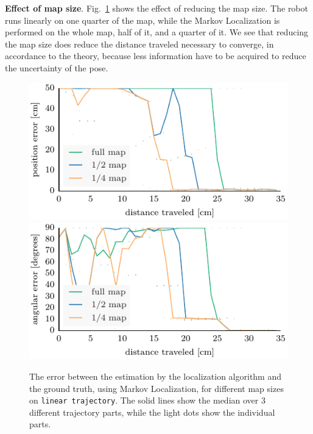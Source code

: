 \documentclass{svmult}
\newcommand{\Fig}[1]{Fig.~\ref{fig:#1}}
\begin{document}
\textbf{Effect of map size}.
\Fig{small-maps} shows the effect of reducing the map size. %
The robot runs linearly on one quarter of the map, while the Markov Localization is performed on the whole map, half of it, and a quarter of it.
We see that reducing the map size does reduce the distance traveled necessary to converge, in accordance to the theory, because less information have to be acquired to reduce the uncertainty of the pose.
 
\begin{figure}
\includegraphics[width=.5\columnwidth]{ml-small_maps-xy}
\hfill
\includegraphics[width=.5\columnwidth]{ml-small_maps-theta}
\caption{The error between the estimation by the localization algorithm and the ground truth, using Markov Localization, for different map sizes on \texttt{linear trajectory}.
The solid lines show the median over 3 different trajectory parts, while the light dots show the individual parts.}
\label{fig:small-maps}
\end{figure}

\end{document}
